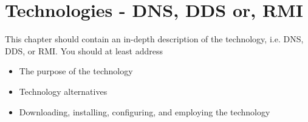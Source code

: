 \chapter{Technologies - DNS, DDS or, RMI}
This chapter should contain an in-depth description of the technology,
i.e. DNS, DDS, or RMI. You should at least address
\begin{itemize}
\item The purpose of the technology
\item Technology alternatives
\item Downloading, installing, configuring, and employing the technology
\end{itemize}